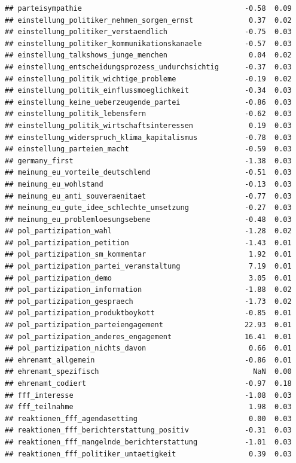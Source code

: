 \documentclass[
]{book}
\begin{document}
\begin{verbatim}
## parteisympathie                                      -0.58  0.09
## einstellung_politiker_nehmen_sorgen_ernst             0.37  0.02
## einstellung_politiker_verstaendlich                  -0.75  0.03
## einstellung_politiker_kommunikationskanaele          -0.57  0.03
## einstellung_talkshows_junge_menchen                   0.04  0.02
## einstellung_entscheidungsprozess_undurchsichtig      -0.37  0.03
## einstellung_politik_wichtige_probleme                -0.19  0.02
## einstellung_politik_einflussmoeglichkeit             -0.34  0.03
## einstellung_keine_ueberzeugende_partei               -0.86  0.03
## einstellung_politik_lebensfern                       -0.62  0.03
## einstellung_politik_wirtschaftsinteressen             0.19  0.03
## einstellung_widerspruch_klima_kapitalismus           -0.78  0.03
## einstellung_parteien_macht                           -0.59  0.03
## germany_first                                        -1.38  0.03
## meinung_eu_vorteile_deutschlend                      -0.51  0.03
## meinung_eu_wohlstand                                 -0.13  0.03
## meinung_eu_anti_souveraenitaet                       -0.77  0.03
## meinung_eu_gute_idee_schlechte_umsetzung             -0.27  0.03
## meinung_eu_problemloesungsebene                      -0.48  0.03
## pol_partizipation_wahl                               -1.28  0.02
## pol_partizipation_petition                           -1.43  0.01
## pol_partizipation_sm_kommentar                        1.92  0.01
## pol_partizipation_partei_veranstaltung                7.19  0.01
## pol_partizipation_demo                                3.05  0.01
## pol_partizipation_information                        -1.88  0.02
## pol_partizipation_gespraech                          -1.73  0.02
## pol_partizipation_produktboykott                     -0.85  0.01
## pol_partizipation_parteiengagement                   22.93  0.01
## pol_partizipation_anderes_engagement                 16.41  0.01
## pol_partizipation_nichts_davon                        0.66  0.01
## ehrenamt_allgemein                                   -0.86  0.01
## ehrenamt_spezifisch                                    NaN  0.00
## ehrenamt_codiert                                     -0.97  0.18
## fff_interesse                                        -1.08  0.03
## fff_teilnahme                                         1.98  0.03
## reaktionen_fff_agendasetting                          0.00  0.03
## reaktionen_fff_berichterstattung_positiv             -0.31  0.03
## reaktionen_fff_mangelnde_berichterstattung           -1.01  0.03
## reaktionen_fff_politiker_untaetigkeit                 0.39  0.03

\end{verbatim}
\end{document}
